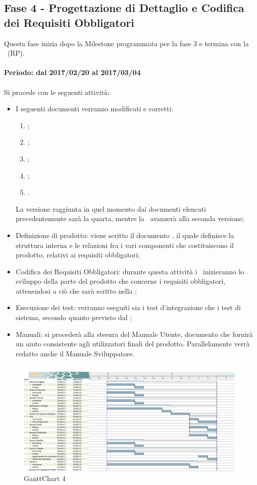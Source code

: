 \documentclass[../PianoDiProgetto.tex]{subfiles}
\begin{document}
\subsection{Fase 4 - Progettazione di Dettaglio e Codifica dei Requisiti Obbligatori}
	Questa fase inizia dopo la Milestone programmata per la fase 3 e termina con la \revisionediprogettazione\ (RP).
	\\
	\\
	\textbf{Periodo: dal 2017/02/20 al 2017/03/04}
	\\
	\\
	Si procede con le seguenti attività:
	\begin{itemize}
		\item I seguenti documenti verranno modificati e corretti:
			\begin{enumerate}
				\item \normediprogetto;
				\item \analisideirequisiti;
				\item \pianodiqualifica;
				\item \pianodiprogetto;
				\item \glossario.
			\end{enumerate}
		La versione raggiunta in quel momento dai documenti elencati precedentemente sarà la quarta, mentre la \specificatecnica\ avanzerà alla seconda versione;
		\item Definizione di prodotto: viene scritto il documento , il quale definisce la struttura interna e le relazioni fra i vari componenti che costituiscono il prodotto, relativi ai requisiti obbligatori;
		\item Codifica dei Requisiti Obbligatori: durante questa attività i \programmatori\ inizieranno lo sviluppo della parte del prodotto che concerne i requisiti obbligatori, attenendosi a ciò che sarà scritto nella ;
		\item Esecuzione dei test: verranno eseguiti sia i test d'integrazione che i test di sistema, secondo quanto previsto dal \pianodiqualifica;
		\item Manuali: si procederà alla stesura del Manuale Utente, documento che fornirà un aiuto consistente agli utilizzatori finali del prodotto. Parallelamente verrà redatto anche il Manuale Sviluppatore.
	\end{itemize}
	
	\newpage
	\begin{figure}[!h]
		\centering
		\includegraphics[width=\textwidth]{Pianificazione/Immagini/GanttChart04.png}
		\caption{GanttChart 4}
	\end{figure}	
	
\end{document}
